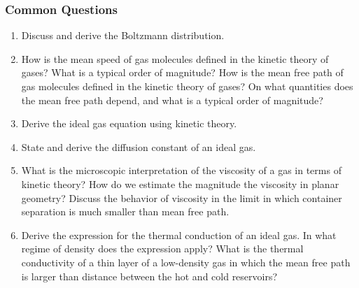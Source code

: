 \documentclass[11pt, a4paper]{article}
\begin{document}
\subsubsection{Common Questions}
\begin{enumerate}
    \item Discuss and derive the Boltzmann distribution.

    \item How is the mean speed of gas molecules defined in the kinetic theory of gases? What is a typical order of magnitude? How is the mean free path of gas molecules defined in the kinetic theory of gases? On what quantities does the mean free path depend, and what is a typical order of magnitude?

    \item Derive the ideal gas equation using kinetic theory.

    \item State and derive the diffusion constant of an ideal gas.

    \item What is the microscopic interpretation of the viscosity of a gas in terms of kinetic theory? How do we estimate the magnitude the viscosity in planar geometry? Discuss the behavior of viscosity in the limit in which container separation is much smaller than mean free path.

    \item Derive the expression for the thermal conduction of an ideal gas. In what regime of density does the expression apply? What is the thermal conductivity of a thin layer of a low-density gas in which the mean free path is larger than distance between the hot and cold reservoirs?

\end{enumerate}
\end{document}
